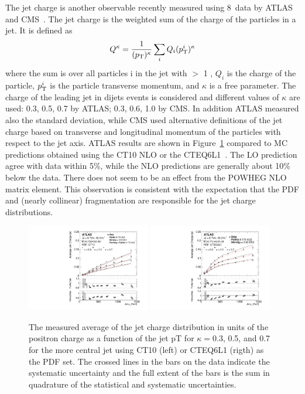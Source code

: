 \documentclass{PoS}
\begin{document}
The jet charge is another observable recently measured using 8~\TeV data by ATLAS~\cite{Aad:2015cua} and
CMS~\cite{CMS:2016yuu}. The jet charge is the \pt weighted sum of the charge of the particles in a
jet. It is defined as 
\begin{equation} \label{Omdef}
Q^\kappa = \frac{1}{(\pt)^\kappa} \sum_{i} Q_i (\pt^i)^\kappa
\end{equation}
where the sum is over all particles i in the jet with \pt $>$ 1 \GeV, $Q_i$ is the charge of the particle, $p_{\mathrm{T}}^i$ is
the particle transverse momentum, and $\kappa$ is a free parameter. The charge of the leading jet in dijets events is
considered and different values of $\kappa$ are used: 0.3, 0.5, 0.7 by ATLAS; 0.3, 0.6, 1.0 by CMS. In addition ATLAS
measured also the standard deviation, while CMS used alternative definitions of the jet charge based on transverse and
longitudinal momentum of the particles with respect to the jet axis. ATLAS results are shown in
Figure~\ref{fig:jetcharge} compared to MC predictions obtained using the CT10 NLO or the
CTEQ6L1~\cite{Pumplin:2002vw}. The LO prediction agree with data within 5\%, while the NLO predictions are generally
about 10\% below the data. There does not seem to be an effect from the POWHEG NLO matrix element.   
This observation is consistent with the expectation that the PDF and (nearly collinear) fragmentation
are responsible for the jet charge distributions.    

\begin{figure}[hbtp]
  \centering
  \includegraphics[width=0.48\textwidth]{Figure10a.pdf}
  \includegraphics[width=0.48\textwidth]{Figure10b.pdf}
  \caption{The measured average of the jet charge distribution in units of the positron charge as a function of the jet
    pT for $\kappa=$0.3, 0.5, and 0.7 for the more central jet using CT10 (left) or CTEQ6L1 (rigth) as the PDF set. The crossed lines in the
    bars on the data indicate the systematic uncertainty and the full extent of the bars is the sum in quadrature of the
    statistical and systematic uncertainties. } 
  \label{fig:jetcharge}
\end{figure}
\end{document}
